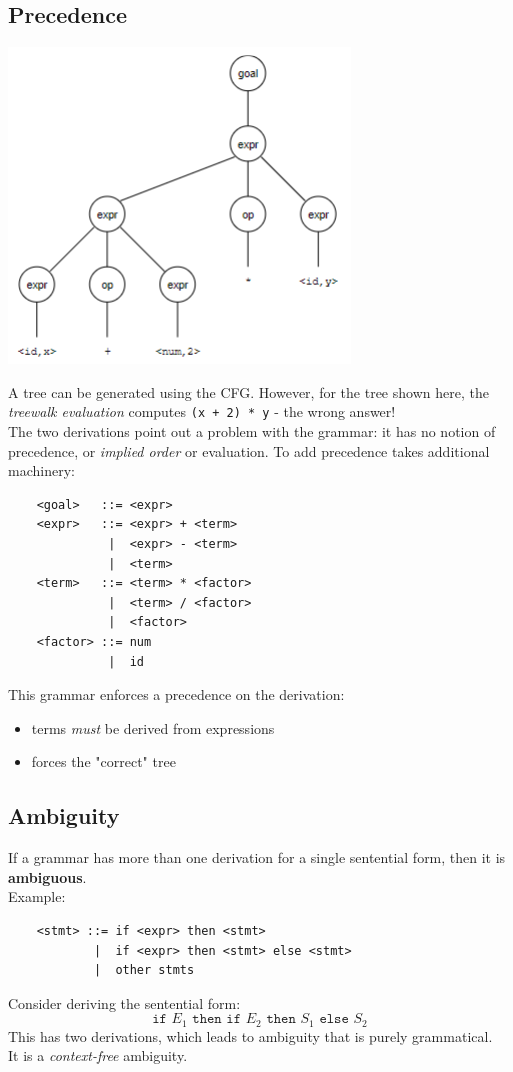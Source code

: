\documentclass[10pt]{article}
\begin{document}
\subsection*{Precedence}
\begin{center}
    \includegraphics*[scale=1]{W1_10.png}
\end{center}
A tree can be generated using the CFG.  However, for the tree shown here, the \textit{treewalk evaluation} computes \texttt{(x + 2) * y} - the wrong answer!\\
The two derivations point out a problem with the grammar: it has no notion of precedence, or \textit{implied order} or evaluation.  To add precedence takes additional machinery:
\begin{verbatim}
    <goal>   ::= <expr>
    <expr>   ::= <expr> + <term>
              |  <expr> - <term>
              |  <term>
    <term>   ::= <term> * <factor>
              |  <term> / <factor>
              |  <factor>
    <factor> ::= num
              |  id
\end{verbatim} 
This grammar enforces a precedence on the derivation:
\begin{itemize}
    \item terms \textit{must} be derived from expressions
    \item forces the "correct" tree
\end{itemize}

\subsection*{Ambiguity}
If a grammar has more than one derivation for a single sentential form, then it is \textbf{ambiguous}.\\
Example:
\begin{verbatim}
    <stmt> ::= if <expr> then <stmt>
            |  if <expr> then <stmt> else <stmt>
            |  other stmts
\end{verbatim}
Consider deriving the sentential form:
\[\texttt{if } E_1 \texttt{ then if } E_2 \texttt{ then } S_1 \texttt{ else } S_2 \]
This has two derivations, which leads to ambiguity that is purely grammatical.\\
It is a \textit{context-free} ambiguity.\\
\end{document}
